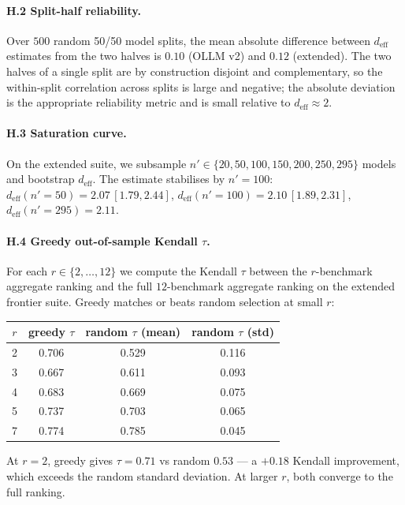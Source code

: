\documentclass{article}
\begin{document}
\paragraph{H.2 Split-half reliability.} Over $500$ random 50/50 model
splits, the mean absolute difference between $d_{\mathrm{eff}}$
estimates from the two halves is $0.10$ (OLLM v2) and $0.12$
(extended). The two halves of a single split are by construction
disjoint and complementary, so the within-split correlation across
splits is large and negative; the absolute deviation is the
appropriate reliability metric and is small relative to
$d_{\mathrm{eff}} \approx 2$.

\paragraph{H.3 Saturation curve.} On the extended suite, we subsample
$n' \in \{20, 50, 100, 150, 200, 250, 295\}$ models and bootstrap
$d_{\mathrm{eff}}$. The estimate stabilises by $n' = 100$:
$d_{\mathrm{eff}}(n' = 50) = 2.07\, [1.79, 2.44]$,
$d_{\mathrm{eff}}(n' = 100) = 2.10\, [1.89, 2.31]$,
$d_{\mathrm{eff}}(n' = 295) = 2.11$.

\paragraph{H.4 Greedy out-of-sample Kendall $\tau$.} For each $r \in
\{2, \ldots, 12\}$ we compute the Kendall $\tau$ between the
$r$-benchmark aggregate ranking and the full $12$-benchmark aggregate
ranking on the extended frontier suite. Greedy matches or beats
random selection at small $r$:
\begin{center}\small
\begin{tabular}{cccc}
\toprule
$r$ & greedy $\tau$ & random $\tau$ (mean) & random $\tau$ (std) \\
\midrule
2 & 0.706 & 0.529 & 0.116 \\
3 & 0.667 & 0.611 & 0.093 \\
4 & 0.683 & 0.669 & 0.075 \\
5 & 0.737 & 0.703 & 0.065 \\
7 & 0.774 & 0.785 & 0.045 \\
\bottomrule
\end{tabular}
\end{center}
At $r = 2$, greedy gives $\tau = 0.71$ vs random $0.53$ --- a
$+0.18$ Kendall improvement, which exceeds the random standard
deviation. At larger $r$, both converge to the full ranking.
\end{document}
